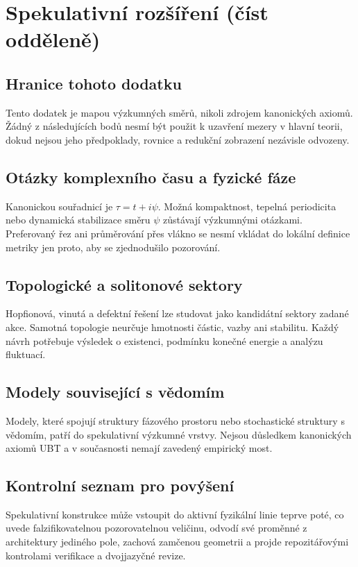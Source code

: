 
\chapter{Spekulativní rozšíření (číst odděleně)}

\section{Hranice tohoto dodatku}
Tento dodatek je mapou výzkumných směrů, nikoli zdrojem kanonických axiomů.
Žádný z následujících bodů nesmí být použit k uzavření mezery v hlavní
teorii, dokud nejsou jeho předpoklady, rovnice a redukční zobrazení nezávisle
odvozeny.

\section{Otázky komplexního času a fyzické fáze}
Kanonickou souřadnicí je $\tau=t+i\psi$. Možná kompaktnost, tepelná periodicita
nebo dynamická stabilizace směru $\psi$ zůstávají výzkumnými otázkami.
Preferovaný řez ani průměrování přes vlákno se nesmí vkládat do lokální
definice metriky jen proto, aby se zjednodušilo pozorování.

\section{Topologické a solitonové sektory}
Hopfionová, vinutá a defektní řešení lze studovat jako kandidátní sektory
zadané akce. Samotná topologie neurčuje hmotnosti částic, vazby ani stabilitu.
Každý návrh potřebuje výsledek o existenci, podmínku konečné energie a
analýzu fluktuací.

\section{Modely související s vědomím}
Modely, které spojují struktury fázového prostoru nebo stochastické struktury
s vědomím, patří do spekulativní výzkumné vrstvy. Nejsou důsledkem
kanonických axiomů UBT a v současnosti nemají zavedený empirický most.

\section{Kontrolní seznam pro povýšení}
Spekulativní konstrukce může vstoupit do aktivní fyzikální linie teprve
poté, co uvede falzifikovatelnou pozorovatelnou veličinu, odvodí své proměnné
z architektury jediného pole, zachová zamčenou geometrii a projde
repozitářovými kontrolami verifikace a dvojjazyčné revize.
